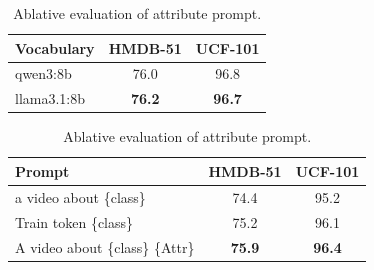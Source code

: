 \documentclass[letterpaper]{article} %
\begin{document}
\begin{table}[tb]
\centering
\scriptsize %
\setlength{\tabcolsep}{3pt} %

\begin{minipage}[t]{0.38\textwidth} 
    \vspace{0pt} %
    \centering
    \begin{threeparttable} 
        \caption{Ablative evaluation of attribute word generators.}
        \label{tab:attributewordgenerators}
        \begin{tabular}{@{}lcc@{}}
        \toprule
        Vocabulary & HMDB-51 & UCF-101 \\
        \midrule
        qwen3:8b & 76.0 & 96.8 \\
        llama3.1:8b & \textbf{76.2} & \textbf{96.7} \\
        \bottomrule
        \end{tabular}
    \end{threeparttable}
\end{minipage}\hfill
\begin{minipage}[t]{0.58\textwidth}
    \vspace{0pt} %
    \centering
    \begin{threeparttable}
        \caption{Ablative evaluation of attribute prompt.}
        \label{tab:attributeprompt}
        \begin{tabular}{@{}lcc@{}}
        \toprule
        Prompt & HMDB-51 & UCF-101 \\
        \midrule
        a video about \{class\} & 74.4 & 95.2 \\
        Train token \{class\}~\cite{zhou2022learning} & 75.2 & 96.1 \\
        A video about \{class\} \{Attr\} & \textbf{75.9} & \textbf{96.4} \\
        \bottomrule
        \end{tabular}
    \end{threeparttable}
\end{minipage}

\vspace{2mm} %


\end{table}
\end{document}
